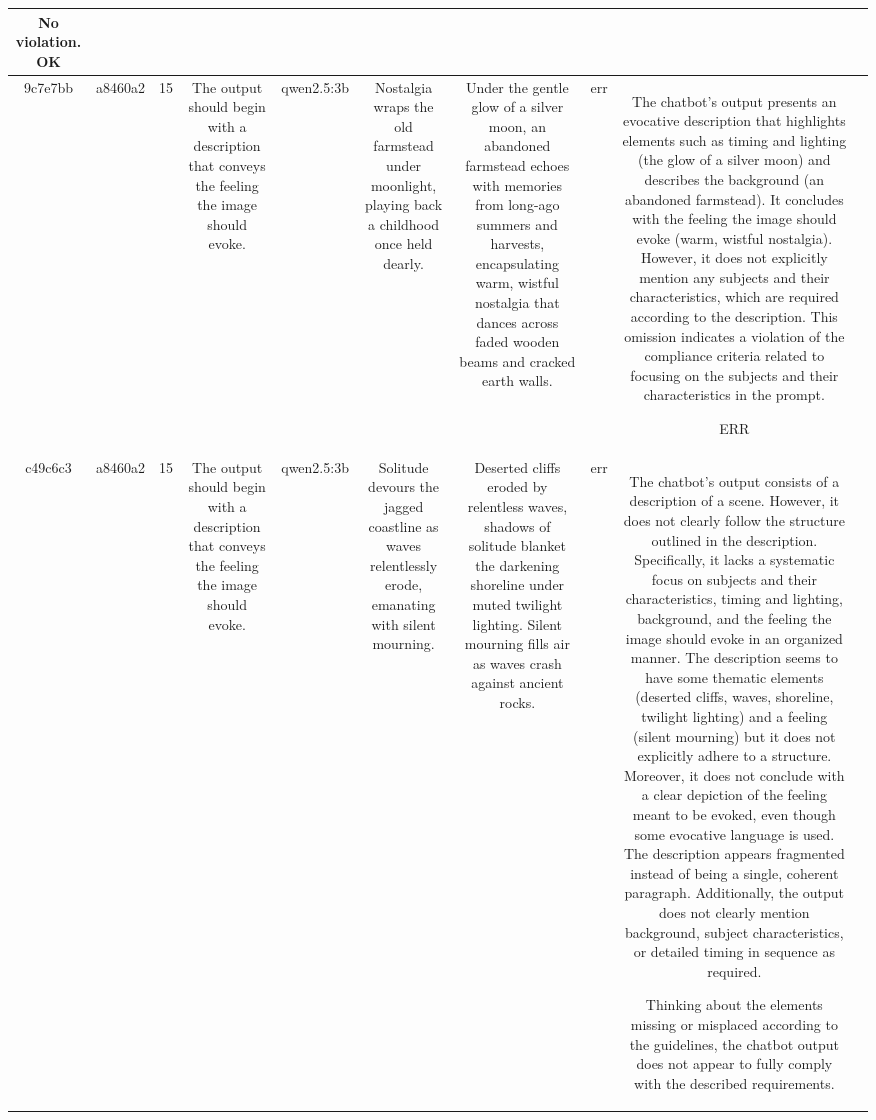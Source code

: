 \begin{table}[h!]
\begin{tabular}{|c|c|c|c|c|c|c|c|c|c|}
No violation.
OK & \\
\hline
9c7e7bb & a8460a2 & 15 & The output should begin with a description that conveys the feeling the image should evoke. & qwen2.5:3b & Nostalgia wraps the old farmstead under moonlight, playing back a childhood once held dearly. & Under the gentle glow of a silver moon, an abandoned farmstead echoes with memories from long-ago summers and harvests, encapsulating warm, wistful nostalgia that dances across faded wooden beams and cracked earth walls. & err & The chatbot's output presents an evocative description that highlights elements such as timing and lighting (the glow of a silver moon) and describes the background (an abandoned farmstead). It concludes with the feeling the image should evoke (warm, wistful nostalgia). However, it does not explicitly mention any subjects and their characteristics, which are required according to the description. This omission indicates a violation of the compliance criteria related to focusing on the subjects and their characteristics in the prompt.

ERR & \\
\hline
c49c6c3 & a8460a2 & 15 & The output should begin with a description that conveys the feeling the image should evoke. & qwen2.5:3b & Solitude devours the jagged coastline as waves relentlessly erode, emanating with silent mourning. & Deserted cliffs eroded by relentless waves, shadows of solitude blanket the darkening shoreline under muted twilight lighting. Silent mourning fills air as waves crash against ancient rocks. & err & The chatbot's output consists of a description of a scene. However, it does not clearly follow the structure outlined in the description. Specifically, it lacks a systematic focus on subjects and their characteristics, timing and lighting, background, and the feeling the image should evoke in an organized manner. The description seems to have some thematic elements (deserted cliffs, waves, shoreline, twilight lighting) and a feeling (silent mourning) but it does not explicitly adhere to a structure. Moreover, it does not conclude with a clear depiction of the feeling meant to be evoked, even though some evocative language is used. The description appears fragmented instead of being a single, coherent paragraph. Additionally, the output does not clearly mention background, subject characteristics, or detailed timing in sequence as required. 

Thinking about the elements missing or misplaced according to the guidelines, the chatbot output does not appear to fully comply with the described requirements.


\end{tabular}
\end{table}
